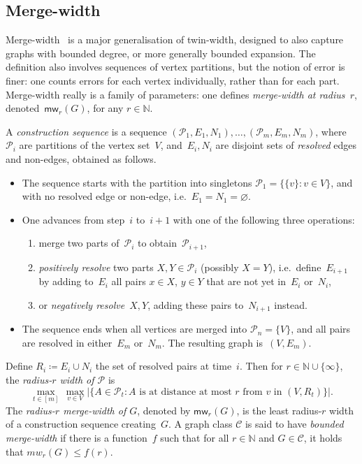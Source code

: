 \documentclass[a4paper,UKenglish,cleveref,thm-restate]{lipics-v2021}
\theoremstyle{remark}
\newcommand{\eqdef}{\coloneqq}
\newcommand{\Cc}{\mathcal{C}}
\newcommand{\Pc}{\mathcal{P}}
\newcommand{\mw}{\mathsf{mw}}
\newcommand{\N}{\mathbb{N}}
\renewcommand{\emptyset}{\varnothing}
\begin{document}
\subsection{Merge-width}
Merge-width~\cite{merge-width} is a major generalisation of twin-width, designed to also capture graphs with bounded degree, or more generally bounded expansion.
The definition also involves sequences of vertex partitions, but the notion of error is finer:
one counts errors for each vertex individually, rather than for each part.
Merge-width really is a family of parameters: one defines \emph{merge-width at radius~$r$}, denoted~$\mw_r(G)$, for any $r \in \N$.

A \emph{construction sequence} is a sequence $(\Pc_1,E_1,N_1) , \ldots, (\Pc_m,E_m,N_m)$,
where~$\Pc_i$ are partitions of the vertex set~$V$, and~$E_i,N_i$ are disjoint sets of \emph{resolved} edges and non-edges, obtained as follows.
\begin{itemize}
    \item The sequence starts with the partition into singletons $\Pc_1 = \{\{v\} : v \in V\}$, and with no resolved edge or non-edge, i.e.\ $E_1 = N_1 = \emptyset$.
    \item One advances from step~$i$ to~$i+1$ with one of the following three operations:
    \begin{enumerate}
        \item merge two parts of~$\Pc_i$ to obtain~$\Pc_{i+1}$,
        \item \emph{positively resolve} two parts $X,Y \in \Pc_i$ (possibly $X=Y$), i.e.\ define~$E_{i+1}$ by adding to~$E_i$ all pairs $x \in X$, $y \in Y$ that are not yet in~$E_i$ or~$N_i$,
        \item or \emph{negatively resolve}~$X,Y$, adding these pairs to~$N_{i+1}$ instead.
    \end{enumerate}
    \item The sequence ends when all vertices are merged into $\Pc_n = \{V\}$, and all pairs are resolved in either~$E_m$ or~$N_m$. The resulting graph is~$(V,E_m)$.
\end{itemize}
Define $R_i \eqdef E_i \cup N_i$ the set of resolved pairs at time~$i$.
Then for $r \in \N \cup \{\infty\}$, the \emph{radius-$r$ width of $\Pc$} is
\[
    \max\limits_{t \in [m]} \, \max\limits_{v \in V} \Big| \bigl\{A \in \Pc_t : A \text{ is at distance at most~$r$ from } v \text{ in } (V, R_t) \bigr\} \Big|.
\]
The \emph{radius-$r$ merge-width of $G$}, denoted by $\mw_r(G)$, is the least radius-$r$ width of a construction sequence creating~$G$.
A graph class $\Cc$ is said to have \emph{bounded merge-width} if there is a function~$f$ such that
for all $r \in \N$ and $G \in \Cc$, it holds that $mw_r(G) \le f(r)$.
\end{document}
